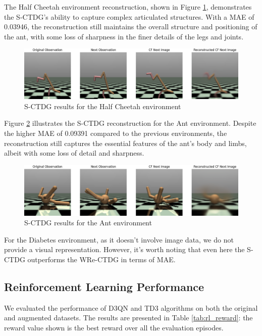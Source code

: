 The Half Cheetah environment reconstruction,
shown in Figure \ref{fig:half_cheetah_recon},
demonstrates the S-CTDG's ability to capture complex articulated structures.
With a MAE of 0.03946, the reconstruction still maintains
the overall structure and positioning of the ant, with some loss of
sharpness in the finer details of the legs and joints.

\begin{figure}[H]
    \centering
    \includegraphics[width=\textwidth]{figures/ch5/e2e_half.png}
    \caption{S-CTDG results for the Half Cheetah environment}
    \label{fig:half_cheetah_recon}
\end{figure}

Figure \ref{fig:ant_recon} illustrates the S-CTDG reconstruction
for the Ant environment. Despite the higher MAE of 0.09391 compared
to the previous environments, the reconstruction still captures
the essential features of the ant's body and limbs, albeit with
some loss of detail and sharpness.

\begin{figure}[H]
    \centering
    \includegraphics[width=\textwidth]{figures/ch5/e2e_ant.png}
    \caption{S-CTDG results for the Ant environment}
    \label{fig:ant_recon}
\end{figure}

For the Diabetes environment, as it doesn't involve image data,
we do not provide a visual representation. However, it's worth noting
that even here the S-CTDG outperforms the WRe-CTDG 
in terms of MAE.

\subsection{Reinforcement Learning Performance}

We evaluated the performance of D3QN and TD3 algorithms on both the
original and augmented datasets. The results are presented
in Table \ref{tab:rl_reward}: the reward value shown is the best reward
over all the evaluation episodes.

